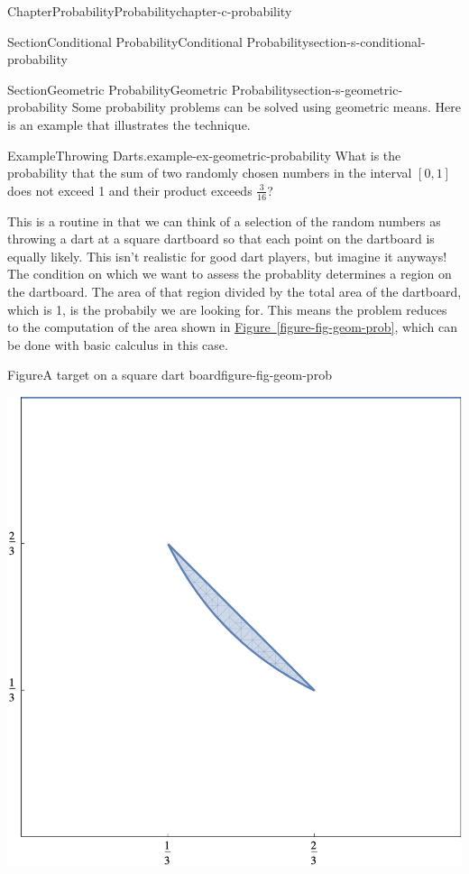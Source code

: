 \documentclass[oneside,10pt,]{book}
\newcommand{\xreffont}{\relax}
\numberwithin{equation}{section}
\begin{document}
\begin{chapterptx}{Chapter}{Probability}{}{Probability}{}{}{chapter-c-probability}
\begin{sectionptx}{Section}{Conditional Probability}{}{Conditional Probability}{}{}{section-s-conditional-probability}
\end{sectionptx}
%
%
\typeout{************************************************}
\typeout{************************************************}
%
\begin{sectionptx}{Section}{Geometric Probability}{}{Geometric Probability}{}{}{section-s-geometric-probability}
Some probability problems can be solved using geometric means. Here is an example that illustrates the technique.%
\begin{example}{Example}{Throwing Darts.}{example-ex-geometric-probability}%
What is the probability that the sum of two randomly chosen numbers in the interval \([0, 1]\) does not exceed 1 and their product exceeds \(\frac{3}{16}\)?%
\par
This is a routine in that we can think of a selection of the random numbers as throwing a dart at a square dartboard so that each point on the dartboard is equally likely.  This isn't realistic for good dart players, but imagine it anyways!  The condition on which  we want to assess the probablity determines a region on the dartboard.  The area of that region divided by the total area of the dartboard, which is 1, is the probabily we are looking for.   This means the problem reduces to the computation of the area shown in \hyperref[figure-fig-geom-prob]{Figure~{\xreffont\ref{figure-fig-geom-prob}}}, which can be done with basic calculus in this case.%
\begin{figureptx}{Figure}{A target on a square dart board}{figure-fig-geom-prob}{}%
\begin{image}{0.2}{0.6}{0.2}%
\includegraphics[width=\linewidth]{images/fig-geom-prob.png}

\end{image}
\end{figureptx}
\end{example}
\end{sectionptx}
\end{chapterptx}
\end{document}
